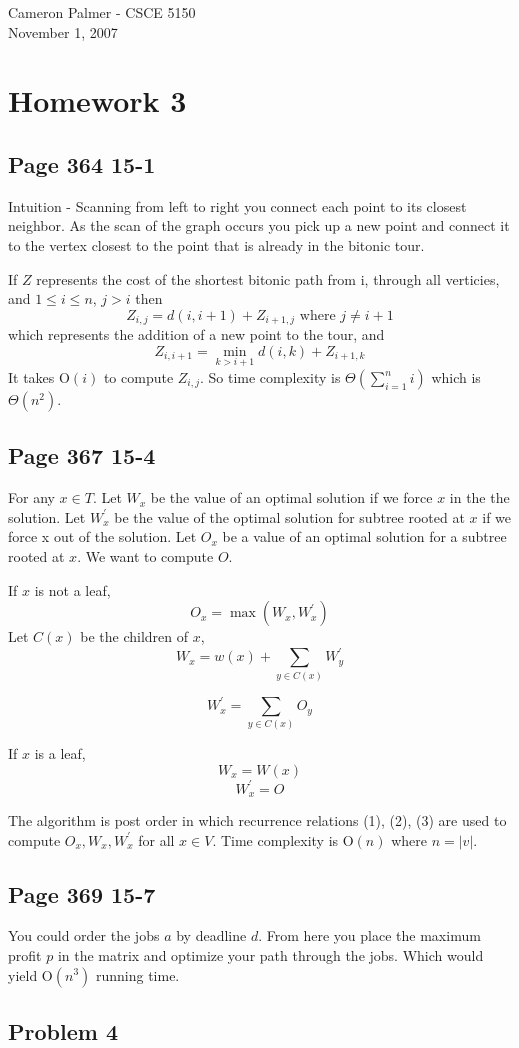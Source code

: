 \documentclass[12pt,twoside,letterpaper]{article}
\begin{document}
Cameron Palmer - CSCE 5150\\
November 1, 2007
\section*{Homework 3}
\subsection*{Page 364 15-1}
Intuition - Scanning from left to right you connect each point to its closest neighbor. As the scan of the graph occurs you pick up a new point and connect it to the vertex closest to the point that is already in the bitonic tour.

If $Z$ represents the cost of the shortest bitonic path from i, through all verticies, and $1 \le i \le n$, $j > i$ then
$$Z_{i,j} = d(i,i+1) + Z_{i+1,j} \textrm{ where } j \ne i+1$$
which represents the addition of a new point to the tour, and
$$Z_{i,i+1} = \min_{k>i+1}{d(i,k) + Z_{i+1,k}}$$
It takes $\textrm{O}(i)$ to compute $Z_{i,j}$. So time complexity is $\Theta(\sum_{i=1}^n i)$ which is $\Theta(n^2)$.

\subsection*{Page 367 15-4}
For any $x \in T$. Let $W_x$ be the value of an optimal solution if we force $x$ in the the solution. Let $W_x^\prime$ be the value of the optimal solution for subtree rooted at $x$ if we force x out of the solution. Let $O_x$ be a value of an optimal solution for a subtree rooted at $x$. We want to compute $O$.

If $x$ is not a leaf,
\begin{equation}
O_x = \max(W_x,W_x^\prime)
\end{equation}
Let $C(x)$ be the children of $x$,
\begin{equation}
W_x = w(x) + \sum_{y \in C(x)} W_y^\prime
\end{equation}

\begin{equation}
W_x^\prime = \sum_{y \in C(x)} O_y
\end{equation}

If $x$ is a leaf,
$$W_x= W(x)$$
$$W_x^\prime = O$$

The algorithm is post order in which recurrence relations (1), (2), (3) are used to compute $O_x, W_x, W_x^\prime$ for all $x \in V$. Time complexity is $\textrm{O}(n)$ where $n = |v|$.

\subsection*{Page 369 15-7}
You could order the jobs $a$ by deadline $d$. From here you place the maximum profit $p$ in the matrix and optimize your path through the jobs. Which would yield $\textrm{O}(n^3)$ running time.



\subsection*{Problem 4}
\end{document}
